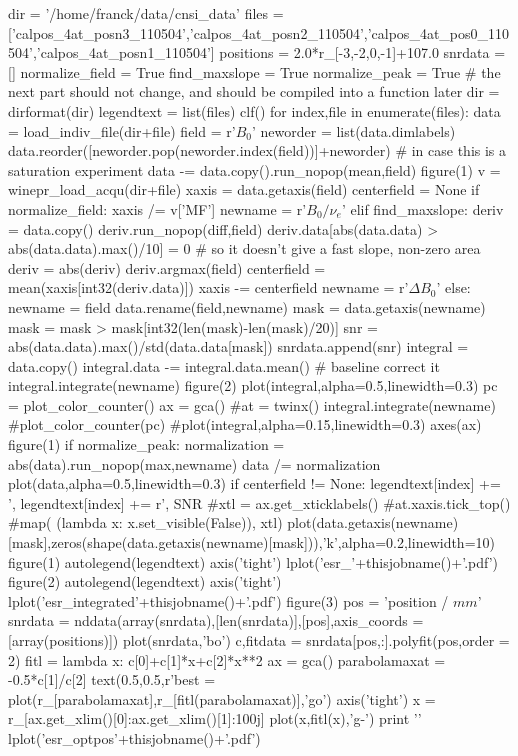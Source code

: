 {\begin{tiny}
\begin{python}
dir = '/home/franck/data/cnsi_data'
files = ['calpos_4at_posn3_110504','calpos_4at_posn2_110504','calpos_4at_pos0_110504','calpos_4at_posn1_110504']
positions = 2.0*r_[-3,-2,0,-1]+107.0
snrdata = []
normalize_field = True
find_maxslope = True
normalize_peak = True
# the next part should not change, and should be compiled into a function later
dir = dirformat(dir)
legendtext = list(files)
clf()
for index,file in enumerate(files):
   data = load_indiv_file(dir+file)
   field = r'$B_0$'
   neworder = list(data.dimlabels)
   data.reorder([neworder.pop(neworder.index(field))]+neworder) # in case this is a saturation experiment
   data -= data.copy().run_nopop(mean,field)
   figure(1)
   v = winepr_load_acqu(dir+file)
   xaxis = data.getaxis(field)
   centerfield = None
   if normalize_field:
       xaxis /= v['MF']
       newname = r'$B_0/\nu_e$'
   elif find_maxslope:
       deriv = data.copy()
       deriv.run_nopop(diff,field)
       deriv.data[abs(data.data) > abs(data.data).max()/10] = 0 # so it doesn't give a fast slope, non-zero area
       deriv = abs(deriv)
       deriv.argmax(field)
       centerfield = mean(xaxis[int32(deriv.data)])
       xaxis -= centerfield
       newname = r'$\Delta B_0$'
   else:
       newname = field
   data.rename(field,newname)
   mask = data.getaxis(newname)
   mask = mask > mask[int32(len(mask)-len(mask)/20)]
   snr = abs(data.data).max()/std(data.data[mask])
   snrdata.append(snr)
   integral = data.copy()
   integral.data -= integral.data.mean() # baseline correct it
   integral.integrate(newname)
   figure(2)
   plot(integral,alpha=0.5,linewidth=0.3)
   pc = plot_color_counter()
   ax = gca()
   #at = twinx()
   integral.integrate(newname)
   #plot_color_counter(pc)
   #plot(integral,alpha=0.15,linewidth=0.3)
   axes(ax)
   figure(1)
   if normalize_peak:
      normalization = abs(data).run_nopop(max,newname)
      data /= normalization
   plot(data,alpha=0.5,linewidth=0.3)
   if centerfield != None:
      legendtext[index] += ', %
   legendtext[index] += r', SNR %
#xtl = ax.get_xticklabels()
#at.xaxis.tick_top()
#map( (lambda x: x.set_visible(False)), xtl)
plot(data.getaxis(newname)[mask],zeros(shape(data.getaxis(newname)[mask])),'k',alpha=0.2,linewidth=10)
figure(1)
autolegend(legendtext)
axis('tight')
lplot('esr_'+thisjobname()+'.pdf')
figure(2)
autolegend(legendtext)
axis('tight')
lplot('esr_integrated'+thisjobname()+'.pdf')
figure(3)
pos = 'position / $mm$'
snrdata = nddata(array(snrdata),[len(snrdata)],[pos],axis_coords = [array(positions)])
plot(snrdata,'bo')
c,fitdata = snrdata[pos,:].polyfit(pos,order = 2)
fitl = lambda x: c[0]+c[1]*x+c[2]*x**2
ax = gca()
parabolamaxat = -0.5*c[1]/c[2]
text(0.5,0.5,r'best = %
plot(r_[parabolamaxat],r_[fitl(parabolamaxat)],'go')
axis('tight')
x = r_[ax.get_xlim()[0]:ax.get_xlim()[1]:100j]
plot(x,fitl(x),'g-')
print '\n\n'
lplot('esr_optpos'+thisjobname()+'.pdf')
\end{python}
\end{tiny}

}
